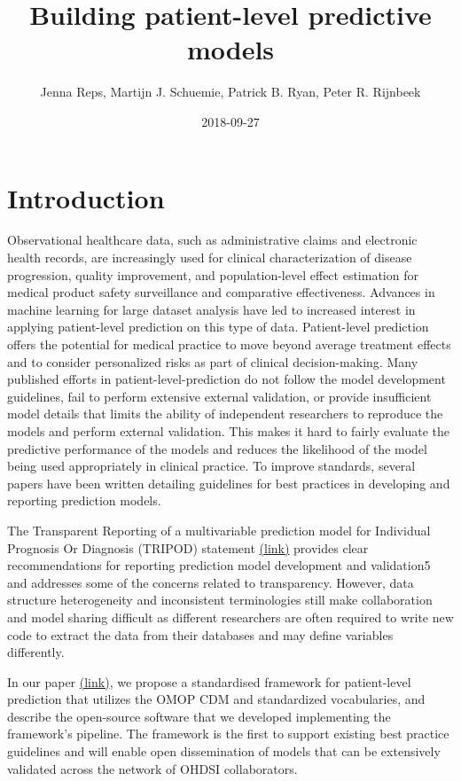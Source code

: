 \documentclass[]{article}
\title{Building patient-level predictive models}
\author{Jenna Reps, Martijn J. Schuemie, Patrick B. Ryan, Peter R. Rijnbeek}
\date{2018-09-27}
\begin{document}
\maketitle

{
\setcounter{tocdepth}{2}
\tableofcontents
}
\section{Introduction}\label{introduction}

Observational healthcare data, such as administrative claims and
electronic health records, are increasingly used for clinical
characterization of disease progression, quality improvement, and
population-level effect estimation for medical product safety
surveillance and comparative effectiveness. Advances in machine learning
for large dataset analysis have led to increased interest in applying
patient-level prediction on this type of data. Patient-level prediction
offers the potential for medical practice to move beyond average
treatment effects and to consider personalized risks as part of clinical
decision-making. Many published efforts in patient-level-prediction do
not follow the model development guidelines, fail to perform extensive
external validation, or provide insufficient model details that limits
the ability of independent researchers to reproduce the models and
perform external validation. This makes it hard to fairly evaluate the
predictive performance of the models and reduces the likelihood of the
model being used appropriately in clinical practice. To improve
standards, several papers have been written detailing guidelines for
best practices in developing and reporting prediction models.

The Transparent Reporting of a multivariable prediction model for
Individual Prognosis Or Diagnosis (TRIPOD) statement
\href{https://www.equator-network.org/reporting-guidelines/tripod-statement/}{(link)}
provides clear recommendations for reporting prediction model
development and validation5 and addresses some of the concerns related
to transparency. However, data structure heterogeneity and inconsistent
terminologies still make collaboration and model sharing difficult as
different researchers are often required to write new code to extract
the data from their databases and may define variables differently.

In our paper
\href{https://academic.oup.com/jamia/article/25/8/969/4989437}{(link)},
we propose a standardised framework for patient-level prediction that
utilizes the OMOP CDM and standardized vocabularies, and describe the
open-source software that we developed implementing the framework's
pipeline. The framework is the first to support existing best practice
guidelines and will enable open dissemination of models that can be
extensively validated across the network of OHDSI collaborators.
\end{document}
